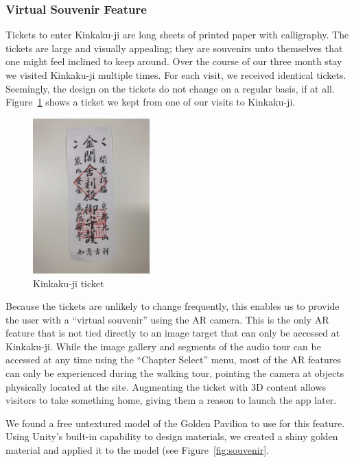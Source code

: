 \documentclass[a4paper, 10pt, american, titlepage]{article}
\begin{document}
\subsubsection{Virtual Souvenir Feature}
\label{sec:virtualSouveneir}

Tickets to enter Kinkaku-ji are long sheets of printed paper with calligraphy.
The tickets are large and visually appealing; they are souvenirs unto themselves
that one might feel inclined to keep around. Over the course of our three month
stay we visited Kinkaku-ji multiple times. For each visit, we received identical
tickets. Seemingly, the design on the tickets do not change on a regular basis,
if at all. Figure~\ref{fig:kinkakujiTicket} shows a ticket we kept from one of
our visits to Kinkaku-ji.

\begin{figure}[h] \centering
    \includegraphics[width=0.4\textwidth]{kinkakuji-ticket.jpeg}
    \caption{Kinkaku-ji ticket}
    \label{fig:kinkakujiTicket}
\end{figure}

Because the tickets are unlikely to change frequently, this enables us to
provide the user with a ``virtual souvenir'' using the AR camera. This is the
only AR feature that is not tied directly to an image target that can only be
accessed at Kinkaku-ji. While the image gallery and segments of the audio tour
can be accessed at any time using the ``Chapter Select'' menu, most of the AR
features can only be experienced during the walking tour, pointing the camera at
objects physically located at the site. Augmenting the ticket with 3D content
allows visitors to take something home, giving them a reason to launch the app
later.

We found a free untextured model of the Golden Pavilion to use for this
feature. Using Unity's built-in capability to design materials, we created
a shiny golden material and applied it to the model (see
Figure~\ref{fig:souvenir}.
\end{document}
